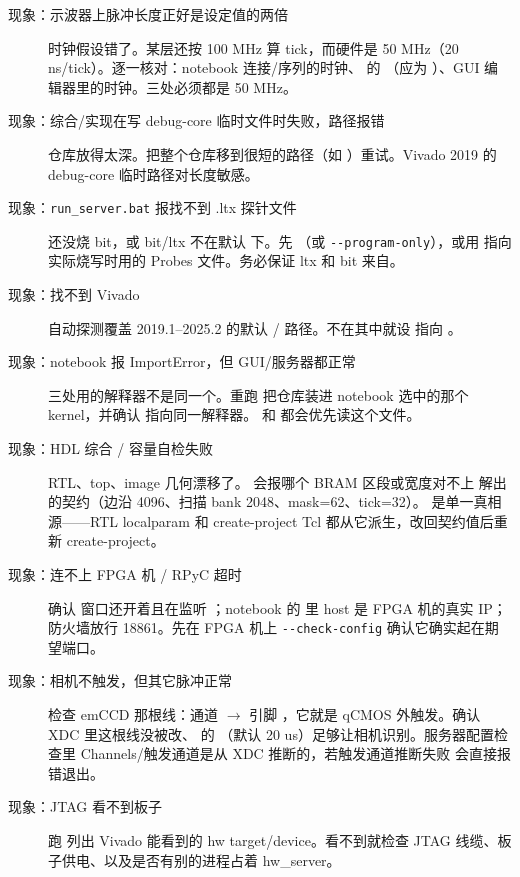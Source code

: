 \documentclass[11pt,oneside,openany]{book}
\begin{document}
\begin{description}

\item[现象：示波器上脉冲长度正好是设定值的两倍] 时钟假设错了。某层还按 100 MHz 算 tick，而硬件是 50 MHz（20 ns/tick）。逐一核对：notebook 连接/序列的时钟、 的 （应为 ）、GUI 编辑器里的时钟。三处必须都是 50 MHz。

\item[现象：综合/实现在写 debug-core 临时文件时失败，路径报错] 仓库放得太深。把整个仓库移到很短的路径（如 ）重试。Vivado 2019 的 debug-core 临时路径对长度敏感。

\item[现象：\texttt{run\_server.bat} 报找不到 .ltx 探针文件] 还没烧 bit，或 bit/ltx 不在默认  下。先 （或 \texttt{-{}-program-only}），或用  指向实际烧写时用的 Probes 文件。务必保证 ltx 和 bit 来自。

\item[现象：找不到 Vivado] 自动探测覆盖 2019.1–2025.2 的默认 / 路径。不在其中就设  指向 。

\item[现象：notebook 报 ImportError，但 GUI/服务器都正常] 三处用的解释器不是同一个。重跑  把仓库装进 notebook 选中的那个 kernel，并确认  指向同一解释器。 和  都会优先读这个文件。

\item[现象：HDL 综合 / 容量自检失败] RTL、top、image 几何漂移了。 会报哪个 BRAM 区段或宽度对不上  解出的契约（边沿 4096、扫描 bank 2048、mask=62、tick=32）。 是单一真相源——RTL localparam 和 create-project Tcl 都从它派生，改回契约值后重新 create-project。

\item[现象：连不上 FPGA 机 / RPyC 超时] 确认  窗口还开着且在监听 ；notebook 的  里 host 是 FPGA 机的真实 IP；防火墙放行 18861。先在 FPGA 机上 \texttt{-{}-check-config} 确认它确实起在期望端口。

\item[现象：相机不触发，但其它脉冲正常] 检查 emCCD 那根线：通道  $\rightarrow$ 引脚 ，它就是 qCMOS 外触发。确认 XDC 里这根线没被改、 的 （默认 20 us）足够让相机识别。服务器配置检查里 Channels/触发通道是从 XDC 推断的，若触发通道推断失败  会直接报错退出。

\item[现象：JTAG 看不到板子] 跑  列出 Vivado 能看到的 hw target/device。看不到就检查 JTAG 线缆、板子供电、以及是否有别的进程占着 hw\_server。

\end{description}
\end{document}
